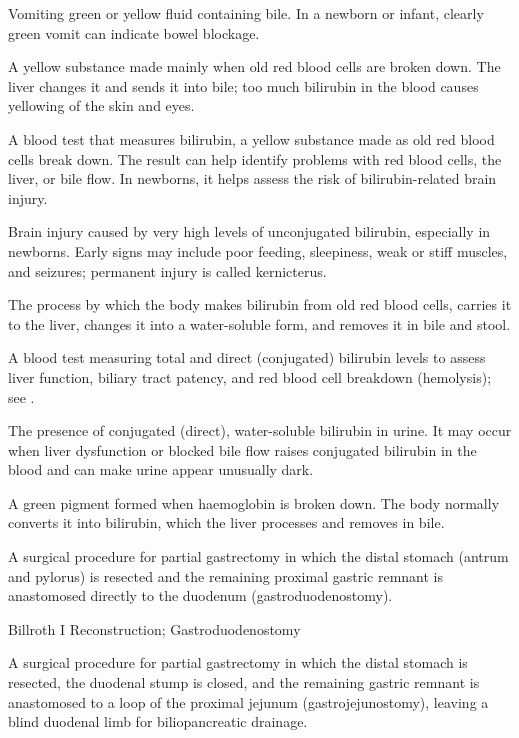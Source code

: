  Vomiting green or yellow fluid containing bile. In a newborn or infant, clearly green vomit can indicate bowel blockage.

 A yellow substance made mainly when old red blood cells are broken down. The liver changes it and sends it into bile; too much bilirubin in the blood causes yellowing of the skin and eyes.

 A blood test that measures bilirubin, a
yellow substance made as old red blood cells break down. The result can help
identify problems with red blood cells, the liver, or bile flow. In newborns,
it helps assess the risk of bilirubin-related brain injury.

 Brain injury caused by very high levels of unconjugated bilirubin, especially in newborns. Early signs may include poor feeding, sleepiness, weak or stiff muscles, and seizures; permanent injury is called kernicterus.

 The process by which the body makes bilirubin from old red blood cells, carries it to the liver, changes it into a water-soluble form, and removes it in bile and stool.

 A blood test measuring total and direct (conjugated) bilirubin levels to assess liver function, biliary tract patency, and red blood cell breakdown (hemolysis); see .

 The presence of conjugated (direct), water-soluble bilirubin in urine. It may occur when liver dysfunction or blocked bile flow raises conjugated bilirubin in the blood and can make urine appear unusually dark.

 A green pigment formed when haemoglobin is broken down. The body normally converts it into bilirubin, which the liver processes and removes in bile.

 A surgical procedure for partial gastrectomy in which the distal stomach (antrum and pylorus) is resected and the remaining proximal gastric remnant is anastomosed directly to the duodenum (gastroduodenostomy).

\synonyms
Billroth I Reconstruction; Gastroduodenostomy

 A surgical procedure for partial gastrectomy in which the distal stomach is resected, the duodenal stump is closed, and the remaining gastric remnant is anastomosed to a loop of the proximal jejunum (gastrojejunostomy), leaving a blind duodenal limb for biliopancreatic drainage.

